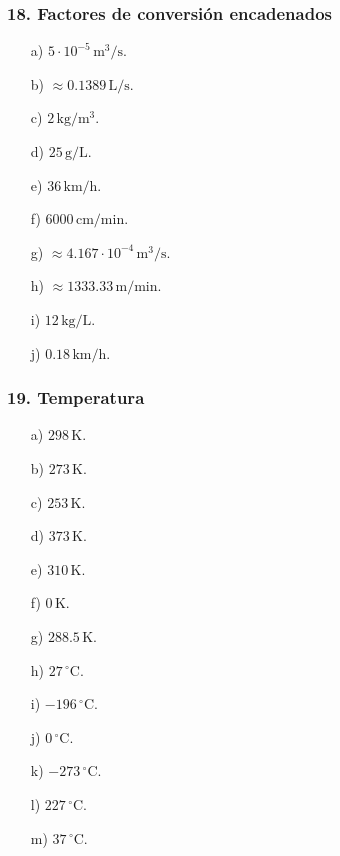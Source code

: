 \subsubsection*{18. Factores de conversión encadenados}
\begin{enumerate}
    \item[a)] $5\cdot10^{-5}\,\mathrm{m^3/s}$.
    \item[b)] $\approx0.1389\,\mathrm{L/s}$.
    \item[c)] $2\,\mathrm{kg/m^3}$.
    \item[d)] $25\,\mathrm{g/L}$.
    \item[e)] $36\,\mathrm{km/h}$.
    \item[f)] $6000\,\mathrm{cm/min}$.
    \item[g)] $\approx4.167\cdot10^{-4}\,\mathrm{m^3/s}$.
    \item[h)] $\approx1333.33\,\mathrm{m/min}$.
    \item[i)] $12\,\mathrm{kg/L}$.
    \item[j)] $0.18\,\mathrm{km/h}$.
\end{enumerate}

\subsubsection*{19. Temperatura}
\begin{enumerate}
    \item[a)] $298\,\mathrm{K}$.
    \item[b)] $273\,\mathrm{K}$.
    \item[c)] $253\,\mathrm{K}$.
    \item[d)] $373\,\mathrm{K}$.
    \item[e)] $310\,\mathrm{K}$.
    \item[f)] $0\,\mathrm{K}$.
    \item[g)] $288.5\,\mathrm{K}$.
    \item[h)] $27\,{}^\circ\mathrm{C}$.
    \item[i)] $-196\,{}^\circ\mathrm{C}$.
    \item[j)] $0\,{}^\circ\mathrm{C}$.
    \item[k)] $-273\,{}^\circ\mathrm{C}$.
    \item[l)] $227\,{}^\circ\mathrm{C}$.
    \item[m)] $37\,{}^\circ\mathrm{C}$.
\end{enumerate}

